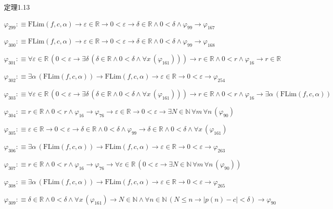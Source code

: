 \begin{fullproof}{定理1.13}
\begin{abbrevlist}
\item $\varphi_{299} :\equiv \mathrm{FLim}(f,c,\alpha) \to \varepsilon \in \mathbb{R} \to 0 < \varepsilon \to \delta \in \mathbb{R} \land 0 < \delta \land \varphi_{99} \to \varphi_{167}$
\item $\varphi_{300} :\equiv \mathrm{FLim}(f,c,\alpha) \to \varepsilon \in \mathbb{R} \to 0 < \varepsilon \to \delta \in \mathbb{R} \land 0 < \delta \land \varphi_{99} \to \varphi_{168}$
\item $\varphi_{301} :\equiv \forall \varepsilon \in \mathbb{R}\,(0 < \varepsilon \to \exists \delta\,(\delta \in \mathbb{R} \land 0 < \delta \land \forall x\,(\varphi_{161}))) \to r \in \mathbb{R} \land 0 < r \land \varphi_{16} \to r \in \mathbb{R}$
\item $\varphi_{302} :\equiv \exists \alpha\,(\mathrm{FLim}(f,c,\alpha)) \to \mathrm{FLim}(f,c,\alpha) \to \varepsilon \in \mathbb{R} \to 0 < \varepsilon \to \varphi_{254}$
\item $\varphi_{303} :\equiv \forall \varepsilon \in \mathbb{R}\,(0 < \varepsilon \to \exists \delta\,(\delta \in \mathbb{R} \land 0 < \delta \land \forall x\,(\varphi_{161}))) \to r \in \mathbb{R} \land 0 < r \land \varphi_{16} \to \exists \alpha\,(\mathrm{FLim}(f,c,\alpha))$
\item $\varphi_{304} :\equiv r \in \mathbb{R} \land 0 < r \land \varphi_{16} \to \varphi_{76} \to \varepsilon \in \mathbb{R} \to 0 < \varepsilon \to \exists N \in \mathbb{N}\,\forall m\,\forall n\,(\varphi_{90})$
\item $\varphi_{305} :\equiv \varepsilon \in \mathbb{R} \to 0 < \varepsilon \to \delta \in \mathbb{R} \land 0 < \delta \land \varphi_{99} \to \delta \in \mathbb{R} \land 0 < \delta \land \forall x\,(\varphi_{161})$
\item $\varphi_{306} :\equiv \exists \alpha\,(\mathrm{FLim}(f,c,\alpha)) \to \mathrm{FLim}(f,c,\alpha) \to \varepsilon \in \mathbb{R} \to 0 < \varepsilon \to \varphi_{263}$
\item $\varphi_{307} :\equiv r \in \mathbb{R} \land 0 < r \land \varphi_{16} \to \varphi_{76} \to \forall \varepsilon \in \mathbb{R}\,(0 < \varepsilon \to \exists N \in \mathbb{N}\,\forall m\,\forall n\,(\varphi_{90}))$
\item $\varphi_{308} :\equiv \exists \alpha\,(\mathrm{FLim}(f,c,\alpha)) \to \mathrm{FLim}(f,c,\alpha) \to \varepsilon \in \mathbb{R} \to 0 < \varepsilon \to \varphi_{265}$
\item $\varphi_{309} :\equiv \delta \in \mathbb{R} \land 0 < \delta \land \forall x\,(\varphi_{161}) \to N \in \mathbb{N} \land \forall n \in \mathbb{N}\,(N \leq n \to \lvert p(n) - c \rvert < \delta) \to \varphi_{90}$

\end{abbrevlist}
\end{fullproof}
